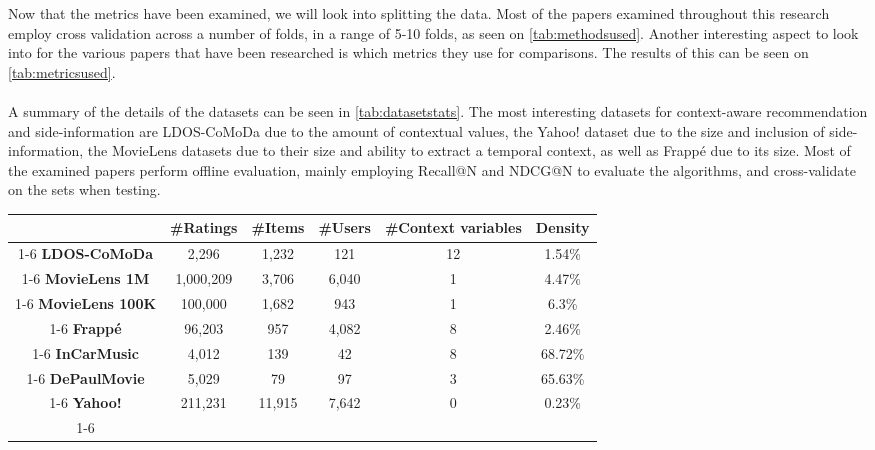 Now that the metrics have been examined, we will look into splitting the data.
Most of the papers examined throughout this research employ cross validation across a number of folds, in a range of 5-10 folds, as seen on \cref{tab:methodsused}.
Another interesting aspect to look into for the various papers that have been researched is which metrics they use for comparisons.
The results of this can be seen on \cref{tab:metricsused}.
\\\\
A summary of the details of the datasets can be seen in \cref{tab:datasetstats}.
The most interesting datasets for context-aware recommendation and side-information are LDOS-CoMoDa due to the amount of contextual values, the Yahoo! dataset due to the size and inclusion of side-information, the MovieLens datasets due to their size and ability to extract a temporal context, as well as Frappé due to its size.
Most of the examined papers perform offline evaluation, mainly employing Recall@N and NDCG@N to evaluate the algorithms, and cross-validate on the sets when testing.
\begin{table*}[]\centering
    \caption{A final summary of the datasets.}\label{tab:datasetstats}
    \scriptsize
    \begin{tabular}{cccccc}\toprule
        &\textbf{\#Ratings} & \textbf{\#Items} & \textbf{\#Users} & \textbf{\#Context variables} & \textbf{Density}\\\cmidrule{1-6}
        \textbf{LDOS-CoMoDa} & 2,296 & 1,232 & 121 & 12 & 1.54\% \\\cmidrule{1-6}
        \textbf{MovieLens 1M} & 1,000,209 & 3,706 & 6,040 & 1 & 4.47\% \\\cmidrule{1-6}
        \textbf{MovieLens 100K} & 100,000 & 1,682 & 943 & 1 & 6.3\% \\\cmidrule{1-6}
        \textbf{Frappé} & 96,203 & 957 & 4,082 & 8 & 2.46\% \\\cmidrule{1-6}
        \textbf{InCarMusic} & 4,012 & 139 & 42 & 8 & 68.72\% \\\cmidrule{1-6}
        \textbf{DePaulMovie} & 5,029 & 79 & 97 & 3 & 65.63\% \\\cmidrule{1-6}
        \textbf{Yahoo!} & 211,231 & 11,915 & 7,642 & 0 & 0.23\% \\\cmidrule{1-6}
    \bottomrule
    \end{tabular}
\end{table*}

